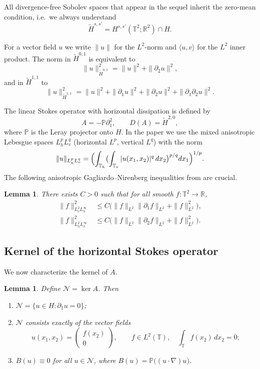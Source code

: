 \documentclass[11pt,a4paper,reqno]{amsart}
\newtheorem{lemma}[theorem]{Lemma}
\theoremstyle{definition}
\newcommand{\T}{\mathbb{T}}
\newcommand{\R}{\mathbb{R}}
\newcommand{\N}{\mathcal{N}}
\newcommand{\PP}{\mathbb{P}}
\begin{document}
All divergence-free Sobolev spaces that appear in the sequel inherit the zero-mean condition, i.e.\ we always understand
\[
  \widetilde H^{s,s'} = H^{s,s'}(\mathbb{T}^2;\mathbb{R}^2) \cap H.
\]

For a vector field $u$ we write $\|u\|$ for the $L^2$-norm and $\langle u,v\rangle$ for the $L^2$ inner product.
The norm in $\widetilde H^{0,1}$ is equivalent to
\[
  \|u\|_{\widetilde H^{0,1}}^2 = \|u\|^2 + \|\partial_2 u\|^2,
\]
and in $\widetilde H^{1,1}$ to
\[
  \|u\|_{\widetilde H^{1,1}}^2 = \|u\|^2 + \|\partial_1 u\|^2 + \|\partial_2 u\|^2 + \|\partial_1\partial_2 u\|^2 .
\]

The linear Stokes operator with horizontal dissipation is defined by
\[
  A = -\mathbb{P}\partial_1^2, \qquad D(A) = \widetilde H^{2,0},
\]
where $\PP$ is the Leray projector onto $H$. In the paper we use the mixed anisotropic Lebesgue spaces $L^p_h L^q_v$ (horizontal $L^p$, vertical $L^q$) with the norm
\[
  \|u\|_{L^p_h L^q_v} =
  \Bigl( \int_{\mathbb{T}_h} \bigl( \int_{\mathbb{T}_v} |u(x_1,x_2)|^q \,dx_2 \bigr)^{p/q} dx_1 \Bigr)^{1/p}.
\]
The following anisotropic Gagliardo--Nirenberg inequalities from \cite{LZZ} are crucial.
\begin{lemma}\label{lem:GN}
  There exists \(C>0\) such that for all smooth \(f:\T^2\to\R\),
  \begin{align*}
    \|f\|_{L^2_v L^\infty_h}^2 &\le C\bigl(\|f\|_{L^2}\|\partial_1 f\|_{L^2} + \|f\|_{L^2}^2\bigr),\\
    \|f\|_{L^2_h L^\infty_v}^2 &\le C\bigl(\|f\|_{L^2}\|\partial_2 f\|_{L^2} + \|f\|_{L^2}^2\bigr).
  \end{align*}
\end{lemma}


\subsection{Kernel of the horizontal Stokes operator}

We now characterize the kernel of $A$.

\begin{lemma}\label{lem:kernel}
  Define $\N = \ker A$.  Then
  \begin{enumerate}
    \item $\N = \{ u\in H : \partial_1 u = 0 \}$;
    \item $\N$ consists exactly of the vector fields
      \begin{equation}\label{eq:kernel_form}
        u(x_1,x_2) = \begin{pmatrix} f(x_2) \\ 0 \end{pmatrix},
        \qquad f\in L^2(\mathbb{T}),\quad \int_{\mathbb{T}} f(x_2)\,dx_2 = 0;
      \end{equation}
    \item $B(u) \equiv 0$ for all $u\in\N$, where $B(u)=\mathbb{P}\big((u\cdot\nabla)u\big)$.
  \end{enumerate}
\end{lemma}
\end{document}
